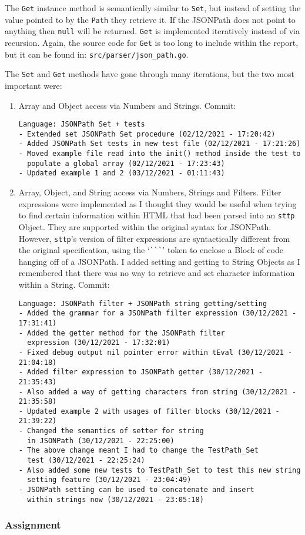 The \verb|Get| instance method is semantically similar to \verb|Set|, but instead of setting the value pointed to by the \verb|Path| they retrieve it. If the JSONPath does not point to anything then \verb|null| will be returned. \verb|Get| is implemented iteratively instead of via recursion. Again, the source code for \verb|Get| is too long to include within the report, but it can be found in: \verb|src/parser/json_path.go|.

The \verb|Set| and \verb|Get| methods have gone through many iterations, but the two most important were:

\begin{enumerate}
    \item Array and Object access via Numbers and Strings. Commit:
    \begin{verbatim}
Language: JSONPath Set + tests
- Extended set JSONPath Set procedure (02/12/2021 - 17:20:42)
- Added JSONPath Set tests in new test file (02/12/2021 - 17:21:26)
- Moved example file read into the init() method inside the test to
  populate a global array (02/12/2021 - 17:23:43)
- Updated example 1 and 2 (03/12/2021 - 01:11:43)
    \end{verbatim}
    \item Array, Object, and String access via Numbers, Strings and Filters. Filter expressions were implemented as I thought they would be useful when trying to find certain information within HTML that had been parsed into an \verb|sttp| Object. They are supported within the original syntax for JSONPath\textsuperscript{\cite{goessner_2007}}. However, \verb|sttp|'s version of filter expressions are syntactically different from the original specification, using the `\verb|```|' token to enclose a Block of code hanging off of a JSONPath. I added setting and getting to String Objects as I remembered that there was no way to retrieve and set character information within a String. Commit:
    \begin{verbatim}
Language: JSONPath filter + JSONPath string getting/setting
- Added the grammar for a JSONPath filter expression (30/12/2021 - 17:31:41)
- Added the getter method for the JSONPath filter
  expression (30/12/2021 - 17:32:01)
- Fixed debug output nil pointer error within tEval (30/12/2021 - 21:04:18)
- Added filter expression to JSONPath getter (30/12/2021 - 21:35:43)
- Also added a way of getting characters from string (30/12/2021 - 21:35:58)
- Updated example 2 with usages of filter blocks (30/12/2021 - 21:39:22)
- Changed the semantics of setter for string
  in JSONPath (30/12/2021 - 22:25:00)
- The above change meant I had to change the TestPath_Set
  test (30/12/2021 - 22:25:24)
- Also added some new tests to TestPath_Set to test this new string
  setting feature (30/12/2021 - 23:04:49)
- JSONPath setting can be used to concatenate and insert
  within strings now (30/12/2021 - 23:05:18)
    \end{verbatim}
\end{enumerate}

\subsubsection{Assignment}
